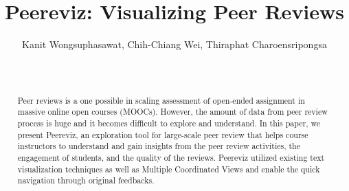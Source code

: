 \documentclass{sigchi}
\begin{document}
\title{Peereviz: Visualizing Peer Reviews}


\author{
  \alignauthor Kanit Wongsuphasawat, Chih-Chiang Wei, Thiraphat Charoensripongsa\\
    \\
    \\
}



\maketitle

\begin{abstract}


Peer reviews is a one possible in scaling assessment of open-ended assignment in
massive online open courses (MOOCs).  However, the amount of data from peer
review process is huge and it becomes difficult to explore and understand.  In
this paper, we present Peereviz, an exploration tool for large-scale peer review
that helps course instructors to understand and gain insights from the peer
review activities, the engagement of students, and the quality of the reviews.
Peereviz utilized existing text visualization techniques as well as  Multiple
Coordinated Views and enable the quick navigation through original feedbacks.
\end{abstract}



\end{document}
